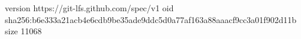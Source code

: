 version https://git-lfs.github.com/spec/v1
oid sha256:b6e333a21acb4e6cdb9be35ade9ddc5d0a77af163a88aaacf9cc3a01f902d11b
size 11068
